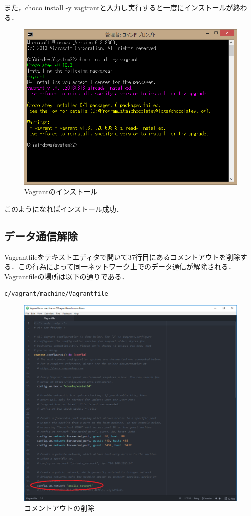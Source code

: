 \newpage

また，choco install -y vagtrantと入力し実行すると一度にインストールが終わる．
\begin{figure}[h]
\centering
\includegraphics[width=12cm]{vagrant2.PNG}
\caption{Vagrantのインストール}\label{サンプル図}
\end{figure}

このようになればインストール成功．

\newpage


\subsection{データ通信解除}

Vagrantfileをテキストエディタで開いて37行目にあるコメントアウトを削除する．この行為によって同一ネットワーク上でのデータ通信が解除される．
Vagrantfileの場所は以下の通りである．

\begin{verbatim}
c/vagrant/machine/Vagrantfile
\end{verbatim}

\begin{figure}[h]
\centering
\includegraphics[width=12cm]{komenntoout.PNG}
\caption{コメントアウトの削除}\label{サンプル図}
\end{figure}

